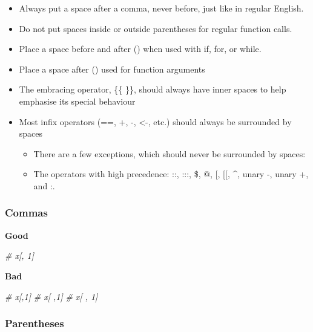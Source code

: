 \documentclass[
]{article}
\newenvironment{Shaded}{\begin{snugshade}}{\end{snugshade}}
\newcommand{\CommentTok}[1]{\textcolor[rgb]{0.56,0.35,0.01}{\textit{#1}}}
\providecommand{\tightlist}{%
  \setlength{\itemsep}{0pt}\setlength{\parskip}{0pt}}
\begin{document}
\begin{itemize}
\tightlist
\item
  Always put a space after a comma, never before, just like in regular
  English.
\item
  Do not put spaces inside or outside parentheses for regular function
  calls.
\item
  Place a space before and after () when used with if, for, or while.
\item
  Place a space after () used for function arguments
\item
  The embracing operator, \{\{ \}\}, should always have inner spaces to
  help emphasise its special behaviour
\item
  Most infix operators (==, +, -, \textless-, etc.) should always be
  surrounded by spaces

  \begin{itemize}
  \tightlist
  \item
    There are a few exceptions, which should never be surrounded by
    spaces:
  \item
    The operators with high precedence: ::, :::, \$, @, {[}, {[}{[},
    \^{}, unary -, unary +, and :.
  \end{itemize}
\end{itemize}

\hypertarget{commas}{%
\subsubsection{Commas}\label{commas}}

\textbf{Good}

\begin{Shaded}
\begin{Highlighting}[]
\CommentTok{# x[, 1]}
\end{Highlighting}
\end{Shaded}

\textbf{Bad}

\begin{Shaded}
\begin{Highlighting}[]
\CommentTok{# x[,1]}
\CommentTok{# x[ ,1]}
\CommentTok{# x[ , 1]}
\end{Highlighting}
\end{Shaded}

\hypertarget{parentheses}{%
\subsubsection{Parentheses}\label{parentheses}}
\end{document}
